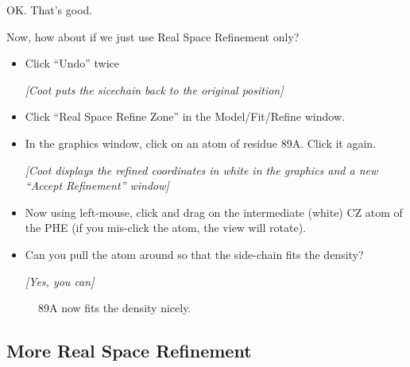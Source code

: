 \documentclass{article}
\begin{document}
OK. That's good.  

Now, how about if we just use Real Space Refinement only?

\begin{itemize}
\item Click \textsf{``Undo''} twice

  \textsl{ [Coot puts the sicechain back to the original position] } 
  
\item Click \textsf{``Real Space Refine Zone''} in the
  Model/Fit/Refine window.
  
\item In the graphics window, click on an atom of residue 89A.  Click
  it again.

  \textsl{ [Coot displays the refined coordinates in white in the
    graphics and a new ``Accept Refinement'' window]}
  
\item Now using left-mouse, click and drag on the intermediate (white)
  CZ atom of the PHE (if you mis-click the atom, the view will
  rotate).
  
\item Can you pull the atom around so that the side-chain fits the
  density?

  \emph{ [Yes, you can] } 

\end{itemize}
  
  \begin{figure}[htbp]
    \begin{center}
      \leavevmode
      \epsfxsize 70mm
      \caption{89A now fits the density nicely.}
      \label{fig:89a-coot}
    \end{center}
  \end{figure}

\subsection{More Real Space Refinement}
\end{document}
